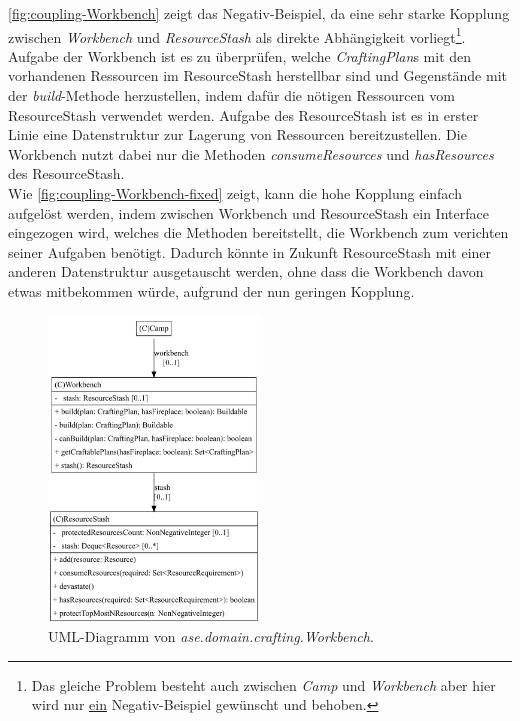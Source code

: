 \autoref{fig:coupling-Workbench} zeigt das Negativ-Beispiel, da eine sehr starke Kopplung zwischen \textit{Workbench} 
und \textit{ResourceStash} als direkte Abhängigkeit vorliegt\footnote{Das gleiche Problem besteht auch 
zwischen \textit{Camp} und \textit{Workbench} aber hier wird nur \underline{ein} Negativ-Beispiel gewünscht und behoben.}. \\
Aufgabe der Workbench ist es zu überprüfen, welche \textit{CraftingPlan}s mit den vorhandenen Ressourcen im 
ResourceStash herstellbar sind und Gegenstände mit der \textit{build}-Methode herzustellen, indem dafür die 
nötigen Ressourcen vom ResourceStash verwendet werden. Aufgabe des ResourceStash ist es in erster Linie eine Datenstruktur
zur Lagerung von Ressourcen bereitzustellen. Die Workbench nutzt dabei nur die Methoden \textit{consumeResources} 
und \textit{hasResources} des ResourceStash. \\
Wie \autoref{fig:coupling-Workbench-fixed} zeigt, kann die hohe Kopplung einfach aufgelöst werden, 
indem zwischen Workbench und ResourceStash ein Interface eingezogen wird, welches die Methoden bereitstellt, 
die Workbench zum verichten seiner Aufgaben benötigt. Dadurch könnte in Zukunft ResourceStash mit einer anderen 
Datenstruktur ausgetauscht werden, ohne dass die Workbench davon etwas mitbekommen würde, aufgrund der nun geringen Kopplung.

\begin{figure}[H]
	\centering
	\includegraphics[width=0.5\textwidth]{Bilder/Workbench_structure.pdf} 
	\caption{UML-Diagramm von \textit{ase.domain.crafting.Workbench}.}
	\label{fig:coupling-Workbench}
\end{figure} 

